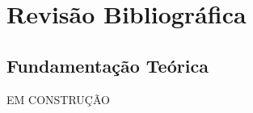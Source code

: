 \section{Revisão Bibliográfica}
\label{sec:revbib}

\subsection{Fundamentação Teórica}


EM CONSTRUÇÃO








